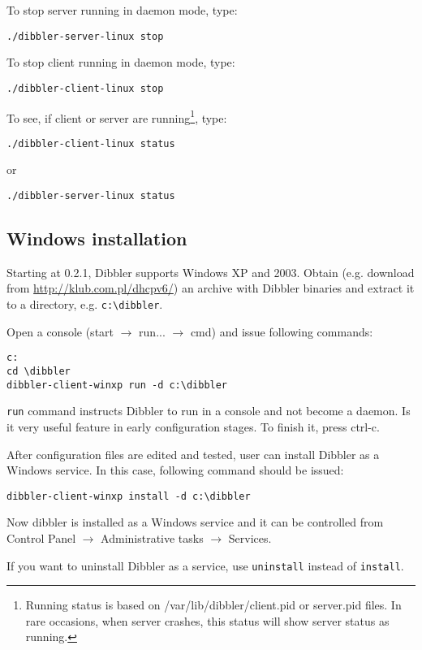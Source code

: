 To stop server running in daemon mode, type:
\begin{verbatim}
./dibbler-server-linux stop
\end{verbatim}

To stop client running in daemon mode, type:
\begin{verbatim}
./dibbler-client-linux stop
\end{verbatim}

To see, if client or server are running\footnote{Running status is
  based on /var/lib/dibbler/client.pid or server.pid files. In rare
  occasions, when server crashes, this status will show server status as running.}, type:
\begin{verbatim}
./dibbler-client-linux status
\end{verbatim}

or
\begin{verbatim}
./dibbler-server-linux status
\end{verbatim}

\subsection{Windows installation}
Starting at 0.2.1, Dibbler supports Windows XP and 2003. 
Obtain (e.g. download from \url{http://klub.com.pl/dhcpv6/}) an archive with
Dibbler binaries and extract it to a directory, e.g. \verb+c:\dibbler+.

Open a console (start $\rightarrow$ run... $\rightarrow$ cmd) and
issue following commands:

\begin{verbatim}
c:
cd \dibbler
dibbler-client-winxp run -d c:\dibbler
\end{verbatim}

\verb+run+ command instructs Dibbler to run in a console and not become a
daemon. Is it very useful feature in early configuration stages. To
finish it, press ctrl-c. 

After configuration files are edited and tested, user can install Dibbler as a
Windows service. In this case, following command should be issued:
\begin{verbatim}
dibbler-client-winxp install -d c:\dibbler
\end{verbatim}

Now dibbler is installed as a Windows service and it can be controlled
from Control Panel $\rightarrow$ Administrative tasks $\rightarrow$
Services. 

If you want to uninstall Dibbler as a service, use \verb+uninstall+
instead of \verb+install+.


